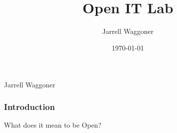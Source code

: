 \documentclass{beamer}
\title[Students]{Open IT Lab}
\author{Jarrell Waggoner}
\institute[Open IT Lab] {Open IT Lab\\
  \medskip
      {\emph{waggonej@email.sc.edu}} }
\date{\today}
\begin{document}
\rm

{
  \begin{frame}
    \vspace{18em}

    \begin{center}\large{\textcolor{beamer@mygrey}{Jarrell Waggoner}}\end{center}


  \end{frame}
}

\begin{frame}
  \frametitle{Introduction}
  \begin{center}\begin{LARGE}What does it mean to be Open?\end{LARGE}\end{center}
\end{frame}
\end{document}
